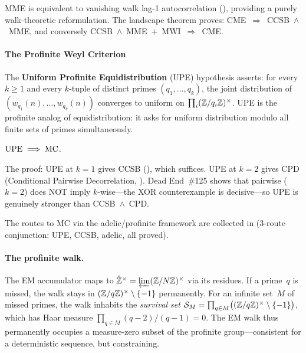 MME is equivalent to vanishing walk lag-1 autocorrelation
(), providing a purely
walk-theoretic reformulation.  The landscape theorem
 proves: CME~$\Rightarrow$~CCSB~$\wedge$~MME,
and conversely CCSB~$\wedge$~MME~$+$~MWI~$\Rightarrow$~CME\@.

\paragraph{The Profinite Weyl Criterion}

The \textbf{Uniform Profinite Equidistribution} (UPE) hypothesis
asserts: for every $k \geq 1$ and every $k$-tuple of distinct primes
$(q_1, \ldots, q_k)$, the joint distribution of
$(w_{q_1}(n), \ldots, w_{q_k}(n))$ converges to uniform on
$\prod_i (\mathbb{Z}/q_i\mathbb{Z})^\times$.  UPE is the profinite analog of
equidistribution: it asks for uniform distribution modulo all finite
sets of primes simultaneously.

\begin{theorem}
$\mathrm{UPE} \;\Longrightarrow\; \mathrm{MC}$.
\end{theorem}

\noindent The proof: UPE at $k = 1$ gives CCSB
(), which suffices.
UPE at $k = 2$ gives CPD (Conditional Pairwise Decorrelation,
).  Dead End~\#125 shows
that pairwise ($k = 2$) does NOT imply $k$-wise---the XOR
counterexample is decisive---so UPE is genuinely stronger than
CCSB~$\wedge$~CPD\@.

The routes to MC via the adelic/profinite framework are collected in
 (3-route conjunction: UPE, CCSB,
adelic, all proved).

\paragraph{The profinite walk.}
The EM accumulator maps to
$\hat{\mathbb{Z}}^\times = \varprojlim (\mathbb{Z}/N\mathbb{Z})^\times$ via its residues.
If a prime~$q$ is missed, the walk stays in
$(\mathbb{Z}/q\mathbb{Z})^\times \setminus \{-1\}$ permanently.
For an infinite set~$M$ of missed primes, the walk inhabits the
\emph{survival set}
$\mathcal{S}_M = \prod_{q \in M}\bigl((\mathbb{Z}/q\mathbb{Z})^\times \setminus \{-1\}\bigr)$,
which has Haar measure $\prod_{q \in M}(q{-}2)/(q{-}1) = 0$.
The EM walk thus permanently occupies a measure-zero subset of the
profinite group---consistent for a deterministic sequence, but
constraining.

